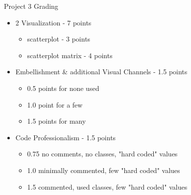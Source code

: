 \documentclass[a4paper,12pt]{article}
\begin{document}
\EndTable  
        


\newpage


\begin{center}
{\huge Project 3 Grading}
\end{center}

\begin{itemize}
	\item 2 Visualization - 7 points
		\begin{itemize}
    		\item scatterplot - 3 points
            \item scatterplot matrix - 4 points
		\end{itemize}
	\item Embellishment \& additional Visual Channels - 1.5 points 
		\begin{itemize}
    		\item 0.5 points for none used
    		\item 1.0 point for a few
            \item 1.5 points for many
		\end{itemize}
	\item Code Professionalism - 1.5 points
		\begin{itemize}
            \item 0.75 no comments, no classes, "hard coded" values
            \item 1.0 minimally commented, few "hard coded" values
            \item 1.5 commented, used classes, few "hard coded" values
		\end{itemize}
\end{itemize}
\end{document}
